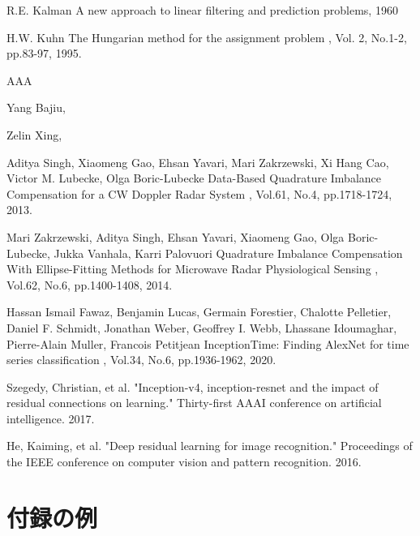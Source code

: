 \begin{bib}[100]
  R.E. Kalman
  \newblock A new approach to linear filtering and prediction problems, 1960

  H.W. Kuhn
  \newblock The Hungarian method for the assignment problem
  , Vol. 2, No.1-2, pp.83-97, 1995.

  AAA

  Yang Bajiu, 

  Zelin Xing, 
	
  Aditya Singh, Xiaomeng Gao, Ehsan Yavari, Mari Zakrzewski, Xi Hang Cao, Victor M. Lubecke, Olga Boric-Lubecke
  \newblock Data-Based Quadrature Imbalance Compensation for a CW Doppler Radar System
  , Vol.61, No.4, pp.1718-1724, 2013.

  Mari Zakrzewski, Aditya Singh, Ehsan Yavari, Xiaomeng Gao, Olga Boric-Lubecke, Jukka Vanhala, Karri Palovuori
  \newblock Quadrature Imbalance Compensation With Ellipse-Fitting Methods for Microwave Radar Physiological Sensing
  , Vol.62, No.6, pp.1400-1408, 2014.

  Hassan Ismail Fawaz, Benjamin Lucas, Germain Forestier, Chalotte Pelletier, Daniel F. Schmidt, Jonathan Weber, Geoffrey I. Webb, Lhassane Idoumaghar, Pierre-Alain Muller, Francois Petitjean
  \newblock InceptionTime: Finding AlexNet for time series classification
  , Vol.34, No.6, pp.1936-1962, 2020.

Szegedy, Christian, et al. "Inception-v4, inception-resnet and the impact of residual connections on learning." Thirty-first AAAI conference on artificial intelligence. 2017.

He, Kaiming, et al. "Deep residual learning for image recognition." Proceedings of the IEEE conference on computer vision and pattern recognition. 2016.

\end{bib}

\appendix
\chapter{付録の例}

